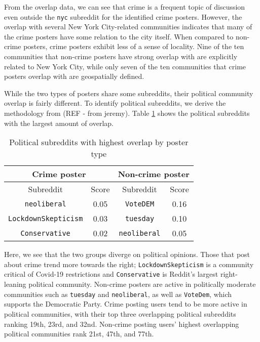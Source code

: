 \documentclass[12pt,oneside, letterpaper]{book}
\begin{document}
\par From the overlap data, we can see that crime is a frequent topic of discussion even outside the \texttt{nyc} subreddit for the identified crime posters. However, the overlap with several New York City-related communities indicates that many of the crime posters have some relation to the city itself. When compared to non-crime posters, crime posters exhibit less of a sense of locality. Nine of the ten communities that non-crime posters have strong overlap with are explicitly related to New York City, while only seven of the ten communities that crime posters overlap with are geospatially defined.

\par While the two types of posters share some subreddits, their political community overlap is fairly different. To identify political subreddits, we derive the methodology from (REF - from jeremy). Table \ref{table:table-8} shows the political subreddits with the largest amount of overlap.

\begin{table}[h!]
    \centering
    \small
    \caption{Political subreddits with highest overlap by poster type}
    \begin{tabular}{| c | c | c | c |}
    \hline
    \multicolumn{2}{|c|}{Crime poster} & \multicolumn{2}{|c|}{Non-crime poster} \\ \hline
    Subreddit & Score & Subreddit & Score\\ \hline
    \texttt{neoliberal} & 0.05 & \texttt{VoteDEM} & 0.16 \\ \hline
    \texttt{LockdownSkepticism} & 0.03 & \texttt{tuesday} & 0.10 \\ \hline
    \texttt{Conservative} & 0.02 & \texttt{neoliberal} & 0.05 \\ \hline
	\end{tabular}
	\label{table:table-8}
\end{table}

\par Here, we see that the two groups diverge on political opinions. Those that post about crime trend more towards the right; \texttt{LockdownSkepticism} is a community critical of Covid-19 restrictions and \texttt{Conservative} is Reddit's largest right-leaning political community. Non-crime posters are active in politically moderate communities such as \texttt{tuesday} and \texttt{neoliberal}, as well as \texttt{VoteDem}, which supports the Democratic Party. Crime posting users tend to be more active in political communities, with their top three overlapping political subreddits ranking 19th, 23rd, and 32nd. Non-crime posting users' highest overlapping political communities rank 21st, 47th, and 77th.
\end{document}
